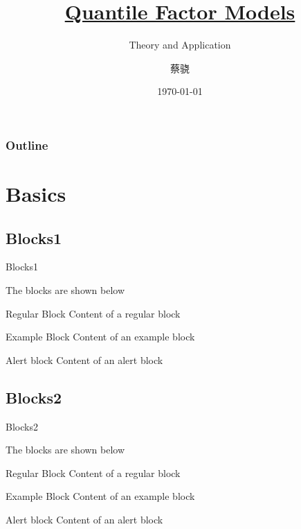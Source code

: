 \documentclass[10pt,aspectratio=169]{beamer} %
\title{\href{https://www.econometricsociety.org/publications/econometrica/2021/03/01/quantile-factor-models}{Quantile Factor Models}}
\subtitle{Theory and Application}   %
\author[Xiao Cai]{蔡骁}
\institute[Hunan University]{\normalsize College of Finance and Statistics, \\Hunan University}
\date{\today}
\begin{document}
\maketitle	

\begin{frame}
	\frametitle{Outline}
	\textbf{\tableofcontents}
\end{frame}	

\section{Basics}
\subsection{Blocks1}
\begin{frame}[c]{Blocks1}
	
The blocks are shown below
\begin{block}{Regular Block}
	Content of a regular block
\end{block}

\begin{exampleblock}{Example Block}
	Content of an example block
\end{exampleblock}

\begin{alertblock}{Alert block}
	Content of an alert block
\end{alertblock}

\end{frame}	
\subsection{Blocks2}
\begin{frame}[c]{Blocks2}
	
The blocks are shown below
\begin{block}{Regular Block}
	Content of a regular block
\end{block}

\begin{exampleblock}{Example Block}
	Content of an example block
\end{exampleblock}

\begin{alertblock}{Alert block}
	Content of an alert block
\end{alertblock}

\end{frame}	
\end{document}
